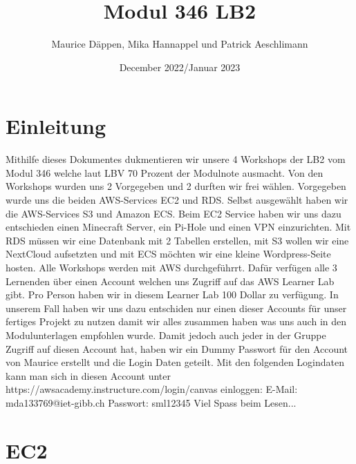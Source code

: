 \documentclass{article}
\title{Modul 346 LB2}
\author{Maurice Däppen, Mika Hannappel und Patrick Aeschlimann}
\date{December 2022/Januar 2023}
\begin{document}
\maketitle

{\clearpage}


\tableofcontents

{\clearpage}

\section{Einleitung}

Mithilfe dieses Dokumentes dukmentieren wir unsere 4 Workshops der LB2 vom Modul 346 welche laut LBV 70 Prozent der Modulnote ausmacht. Von den Workshops wurden uns 2 Vorgegeben und 2 durften wir frei wählen. Vorgegeben wurde uns die beiden AWS-Services EC2 und RDS. Selbst ausgewählt haben wir die AWS-Services S3 und Amazon ECS. Beim EC2 Service haben wir uns dazu entschieden einen Minecraft Server, ein Pi-Hole und einen VPN einzurichten. Mit RDS müssen wir eine Datenbank mit 2 Tabellen erstellen, mit S3 wollen wir eine NextCloud aufsetzten und mit ECS möchten wir eine kleine Wordpress-Seite hosten. 
\newline
\newline
Alle Workshops werden mit AWS durchgeführrt. Dafür verfügen alle 3 Lernenden über einen Account welchen uns Zugriff auf das AWS Learner Lab gibt. Pro Person haben wir in diesem Learner Lab 100 Dollar zu verfügung. In unserem Fall haben wir uns dazu entschiden nur einen dieser Accounts für unser fertiges Projekt zu nutzen damit wir alles zusammen haben was uns auch in den Modulunterlagen empfohlen wurde. Damit jedoch auch jeder in der Gruppe Zugriff auf diesen Account hat, haben wir ein Dummy Passwort für den Account von Maurice erstellt und die Login Daten geteilt. Mit den folgenden Logindaten kann man sich in diesen Account unter https://awsacademy.instructure.com/login/canvas einloggen:
\newline
\newline
E-Mail: mda133769@iet-gibb.ch
\newline
Passwort: sml12345
\newline
\newline
Viel Spass beim Lesen...



{\clearpage}

\section{EC2}
\end{document}

